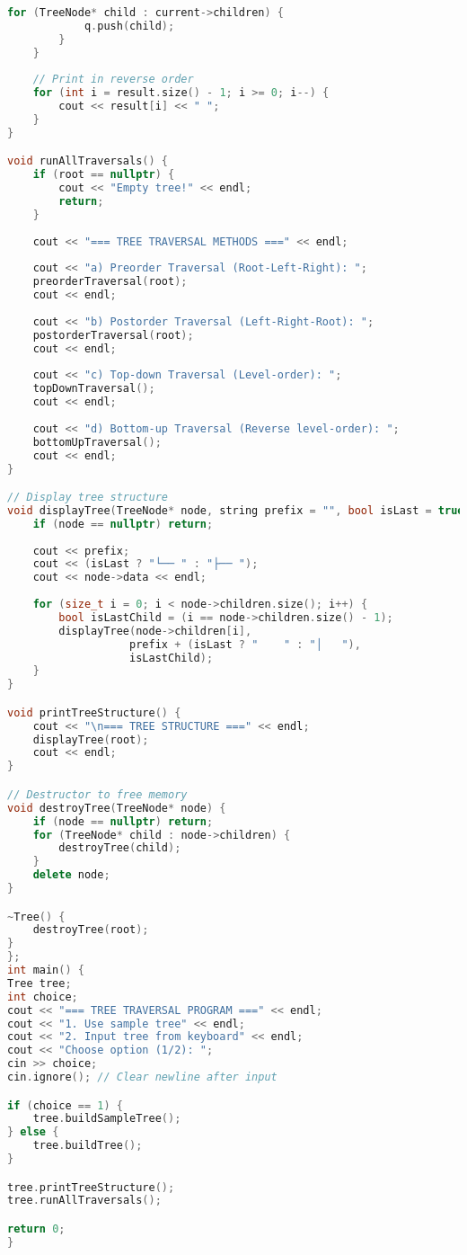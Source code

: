 \documentclass[12pt]{article}
\begin{document}
\begin{lstlisting}[language=C++, caption=Chương trình duyệt cây C++]
        for (TreeNode* child : current->children) {
            q.push(child);
        }
    }
    
    // Print in reverse order
    for (int i = result.size() - 1; i >= 0; i--) {
        cout << result[i] << " ";
    }
}

void runAllTraversals() {
    if (root == nullptr) {
        cout << "Empty tree!" << endl;
        return;
    }
    
    cout << "=== TREE TRAVERSAL METHODS ===" << endl;
    
    cout << "a) Preorder Traversal (Root-Left-Right): ";
    preorderTraversal(root);
    cout << endl;
    
    cout << "b) Postorder Traversal (Left-Right-Root): ";
    postorderTraversal(root);
    cout << endl;
    
    cout << "c) Top-down Traversal (Level-order): ";
    topDownTraversal();
    cout << endl;
    
    cout << "d) Bottom-up Traversal (Reverse level-order): ";
    bottomUpTraversal();
    cout << endl;
}

// Display tree structure
void displayTree(TreeNode* node, string prefix = "", bool isLast = true) {
    if (node == nullptr) return;
    
    cout << prefix;
    cout << (isLast ? "└── " : "├── ");
    cout << node->data << endl;
    
    for (size_t i = 0; i < node->children.size(); i++) {
        bool isLastChild = (i == node->children.size() - 1);
        displayTree(node->children[i], 
                   prefix + (isLast ? "    " : "│   "), 
                   isLastChild);
    }
}

void printTreeStructure() {
    cout << "\n=== TREE STRUCTURE ===" << endl;
    displayTree(root);
    cout << endl;
}

// Destructor to free memory
void destroyTree(TreeNode* node) {
    if (node == nullptr) return;
    for (TreeNode* child : node->children) {
        destroyTree(child);
    }
    delete node;
}

~Tree() {
    destroyTree(root);
}
};
int main() {
Tree tree;
int choice;
cout << "=== TREE TRAVERSAL PROGRAM ===" << endl;
cout << "1. Use sample tree" << endl;
cout << "2. Input tree from keyboard" << endl;
cout << "Choose option (1/2): ";
cin >> choice;
cin.ignore(); // Clear newline after input

if (choice == 1) {
    tree.buildSampleTree();
} else {
    tree.buildTree();
}

tree.printTreeStructure();
tree.runAllTraversals();

return 0;
}
\end{lstlisting}
\end{document}
